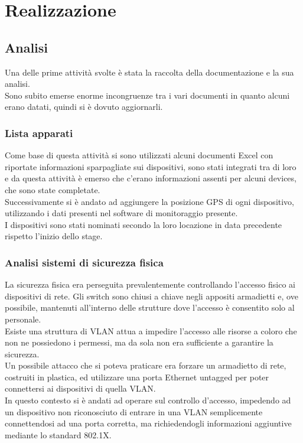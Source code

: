 \documentclass[Tesi.tex]{subfiles}
\begin{document}
\chapter{Realizzazione}

\section{Analisi}

Una delle prime attività svolte è stata la raccolta della documentazione e la sua analisi. \\
Sono subito emerse enorme incongruenze tra i vari documenti in quanto alcuni erano datati, quindi si è dovuto aggiornarli. \\

\subsection{Lista apparati}
Come base di questa attività si sono utilizzati alcuni documenti Excel con riportate informazioni sparpagliate sui dispositivi, sono stati integrati tra di loro e da questa attività è emerso che c'erano informazioni assenti per alcuni devices, che sono state completate. \\
Successivamente si è andato ad aggiungere la posizione GPS di ogni dispositivo, utilizzando i dati presenti nel software di monitoraggio presente. \\
I dispositivi sono stati nominati secondo la loro locazione in data precedente rispetto l'inizio dello stage. \\

\subsection{Analisi sistemi di sicurezza fisica}
La sicurezza fisica era perseguita prevalentemente controllando l'accesso fisico ai dispositivi di rete. Gli switch sono chiusi a chiave negli appositi armadietti e, ove possibile, mantenuti all'interno delle strutture dove l'accesso è consentito solo al personale. \\
Esiste una struttura di VLAN attua a impedire l'accesso alle risorse a coloro che non ne possiedono i permessi, ma da sola non era sufficiente a garantire la sicurezza. \\
Un possibile attacco che si poteva praticare era forzare un armadietto di rete, costruiti in plastica, ed utilizzare una porta Ethernet untagged per poter connettersi ai dispositivi di quella VLAN. \\
In questo contesto si è andati ad operare sul controllo d'accesso, impedendo ad un dispositivo non riconosciuto di entrare in una VLAN semplicemente connettendosi ad una porta corretta, ma richiedendogli informazioni aggiuntive mediante lo standard 802.1X.
\end{document}

